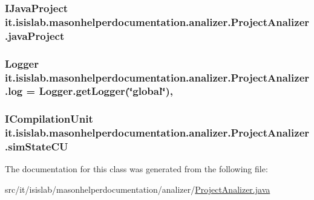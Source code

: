 \hypertarget{classit_1_1isislab_1_1masonhelperdocumentation_1_1analizer_1_1_project_analizer_a8df706a1af9fdd057124a0e0d13a675d}{
\subsubsection[{java\-Project}]{\setlength{\rightskip}{0pt plus 5cm}I\-Java\-Project it.\-isislab.\-masonhelperdocumentation.\-analizer.\-Project\-Analizer.\-java\-Project\hspace{0.3cm}{\ttfamily [private]}}}\label{classit_1_1isislab_1_1masonhelperdocumentation_1_1analizer_1_1_project_analizer_a8df706a1af9fdd057124a0e0d13a675d}
\hypertarget{classit_1_1isislab_1_1masonhelperdocumentation_1_1analizer_1_1_project_analizer_a3a2698c8ab70661f2656b194d35c5dd7}{
\subsubsection[{log}]{\setlength{\rightskip}{0pt plus 5cm}Logger it.\-isislab.\-masonhelperdocumentation.\-analizer.\-Project\-Analizer.\-log = Logger.\-get\-Logger(\char`\"{}global\char`\"{})\hspace{0.3cm}{\ttfamily [static]}, {\ttfamily [private]}}}\label{classit_1_1isislab_1_1masonhelperdocumentation_1_1analizer_1_1_project_analizer_a3a2698c8ab70661f2656b194d35c5dd7}
\hypertarget{classit_1_1isislab_1_1masonhelperdocumentation_1_1analizer_1_1_project_analizer_a0fca1d0eb206f331ea5079aa3e6c9fe7}{
\subsubsection[{sim\-State\-C\-U}]{\setlength{\rightskip}{0pt plus 5cm}I\-Compilation\-Unit it.\-isislab.\-masonhelperdocumentation.\-analizer.\-Project\-Analizer.\-sim\-State\-C\-U\hspace{0.3cm}{\ttfamily [private]}}}\label{classit_1_1isislab_1_1masonhelperdocumentation_1_1analizer_1_1_project_analizer_a0fca1d0eb206f331ea5079aa3e6c9fe7}


The documentation for this class was generated from the following file\-:\begin{DoxyCompactItemize}
\item 
src/it/isislab/masonhelperdocumentation/analizer/\hyperlink{_project_analizer_8java}{Project\-Analizer.\-java}\end{DoxyCompactItemize}
